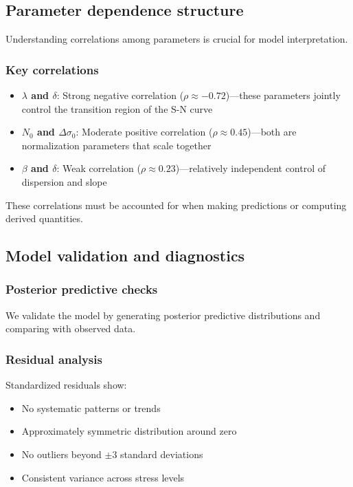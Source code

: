 \subsection{Parameter dependence structure}

Understanding correlations among parameters is crucial for model interpretation.

\subsubsection*{Key correlations}

\begin{itemize}
\item \textbf{$\lambda$ and $\delta$}: Strong negative correlation ($\rho \approx -0.72$)—these parameters jointly control the transition region of the S-N curve
\item \textbf{$N_0$ and $\Delta\sigma_0$}: Moderate positive correlation ($\rho \approx 0.45$)—both are normalization parameters that scale together
\item \textbf{$\beta$ and $\delta$}: Weak correlation ($\rho \approx 0.23$)—relatively independent control of dispersion and slope
\end{itemize}

These correlations must be accounted for when making predictions or computing derived quantities.

\subsection{Model validation and diagnostics}

\subsubsection*{Posterior predictive checks}

We validate the model by generating posterior predictive distributions and comparing with observed data.

\subsubsection*{Residual analysis}

Standardized residuals show:
\begin{itemize}
\item No systematic patterns or trends
\item Approximately symmetric distribution around zero
\item No outliers beyond $\pm 3$ standard deviations
\item Consistent variance across stress levels
\end{itemize}

